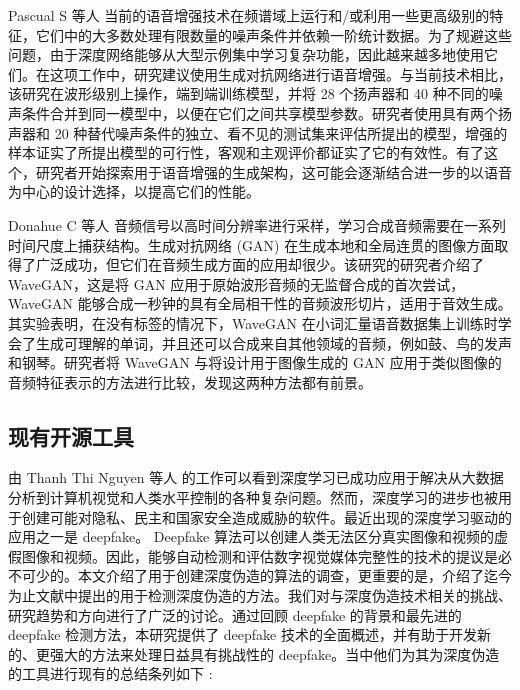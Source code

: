 Pascual S 等人 \cite{pascual2017segan} 当前的语音增强技术在频谱域上运行和/或利用一些更高级别的特征，它们中的大多数处理有限数量的噪声条件并依赖一阶统计数据。为了规避这些问题，由于深度网络能够从大型示例集中学习复杂功能，因此越来越多地使用它们。在这项工作中，研究建议使用生成对抗网络进行语音增强。与当前技术相比，该研究在波形级别上操作，端到端训练模型，并将 28 个扬声器和 40 种不同的噪声条件合并到同一模型中，以便在它们之间共享模型参数。研究者使用具有两个扬声器和 20 种替代噪声条件的独立、看不见的测试集来评估所提出的模型，增强的样本证实了所提出模型的可行性，客观和主观评价都证实了它的有效性。有了这个，研究者开始探索用于语音增强的生成架构，这可能会逐渐结合进一步的以语音为中心的设计选择，以提高它们的性能。

Donahue C 等人 \cite{donahue2018adversarial} 音频信号以高时间分辨率进行采样，学习合成音频需要在一系列时间尺度上捕获结构。生成对抗网络 (GAN) 在生成本地和全局连贯的图像方面取得了广泛成功，但它们在音频生成方面的应用却很少。该研究的研究者介绍了 WaveGAN，这是将 GAN 应用于原始波形音频的无监督合成的首次尝试，WaveGAN 能够合成一秒钟的具有全局相干性的音频波形切片，适用于音效生成。其实验表明，在没有标签的情况下，WaveGAN 在小词汇量语音数据集上训练时学会了生成可理解的单词，并且还可以合成来自其他领域的音频，例如鼓、鸟的发声和钢琴。研究者将 WaveGAN 与将设计用于图像生成的 GAN 应用于类似图像的音频特征表示的方法进行比较，发现这两种方法都有前景。

\subsection{现有开源工具}

由 Thanh Thi Nguyen 等人 \cite{https://doi.org/10.48550/arxiv.1909.11573}的工作可以看到深度学习已成功应用于解决从大数据分析到计算机视觉和人类水平控制的各种复杂问题。然而，深度学习的进步也被用于创建可能对隐私、民主和国家安全造成威胁的软件。最近出现的深度学习驱动的应用之一是 deepfake。 Deepfake 算法可以创建人类无法区分真实图像和视频的虚假图像和视频。因此，能够自动检测和评估数字视觉媒体完整性的技术的提议是必不可少的。本文介绍了用于创建深度伪造的算法的调查，更重要的是，介绍了迄今为止文献中提出的用于检测深度伪造的方法。我们对与深度伪造技术相关的挑战、研究趋势和方向进行了广泛的讨论。通过回顾 deepfake 的背景和最先进的 deepfake 检测方法，本研究提供了 deepfake 技术的全面概述，并有助于开发新的、更强大的方法来处理日益具有挑战性的 deepfake。当中他们为其为深度伪造的工具进行现有的总结条列如下 :

